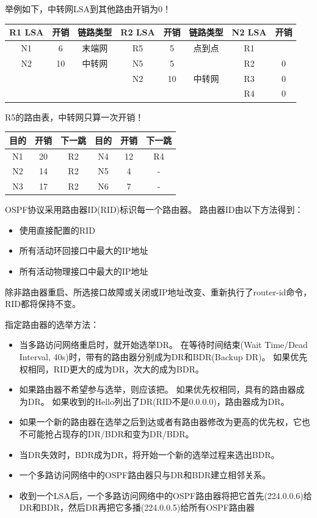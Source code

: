 \begin{analysis}
	举例如下，中转网LSA到其他路由开销为0！
	\begin{center}
	\begin{tabular}{ccc|ccc|cc}\hline
		R1 LSA & 开销 & 链路类型 & R2 LSA & 开销 & 链路类型 & N2 LSA & 开销\\\hline
		N1 & 6 & 末端网 & R5 & 5 & 点到点 & R1 & \textemph{0}\\
		N2 & 10 & 中转网 & N5 & 5 & \textemph{末端网} & R2 & 0\\
		& & & N2 & 10 & 中转网 & R3 & 0\\
		& & & & & & R4 & 0\\\hline
	\end{tabular}
	\end{center}
	R5的路由表，中转网只算一次开销！
	\begin{center}
	\begin{tabular}{ccc|ccc}\hline
		目的 & 开销 & 下一跳 & 目的 & 开销 & 下一跳\\\hline
		N1 & 20 & R2 & N4 & 12 & R4\\
		N2 & 14 & R2 & N5 & 4 & -\\
		N3 & 17 & R2 & N6 & 7 & -\\\hline
	\end{tabular}
	\end{center}
\end{analysis}

\myhline
OSPF协议采用路由器ID(RID)标识每一个路由器。
路由器ID由以下方法得到：
\begin{itemize}
	\item 使用直接配置的RID
	\item 所有活动环回接口中最大的IP地址
	\item 所有活动物理接口中最大的IP地址
\end{itemize}
除非路由器重启、所选接口故障或关闭或IP地址改变、重新执行了router-id命令，RID都将保持不变。


\myhline
指定路由器的选举方法：
\begin{itemize}
	\item 当多路访问网络重启时，就开始选举DR。
	在等待时间结束(Wait Time/Dead Interval, 40s)时，带有的路由器分别成为DR和BDR(Backup DR)。
	如果优先权相同，RID更大的成为DR，次大的成为BDR。
	\item 如果路由器不希望参与选举，则应该把。
	如果优先权相同，具有的路由器成为DR。
	如果收到的Hello列出了DR(RID不是0.0.0.0)，路由器成为DR。
	\item 如果一个新的路由器在选举之后到达或者有路由器修改为更高的优先权，它也不可能抢占现存的DR/BDR和变为DR/BDR。
	\item 当DR失效时，BDR成为DR，将开始一个新的选举过程来选出BDR。
	\item 一个多路访问网络中的OSPF路由器只与DR和BDR建立相邻关系。
	\item 收到一个LSA后，一个多路访问网络中的OSPF路由器将把它首先(224.0.0.6)给DR和BDR，然后DR再把它多播(224.0.0.5)给所有OSPF路由器
\end{itemize}

